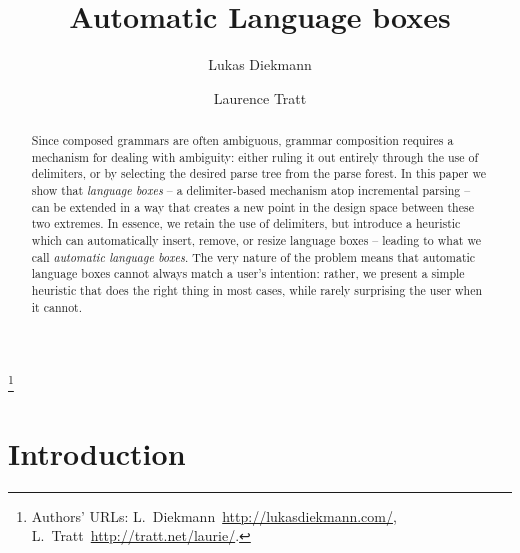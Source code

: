 \documentclass[sigplan,screen]{acmart}\settopmatter{printfolios=true,printccs=false,printacmref=false}
\begin{document}
\title{Automatic Language boxes}

\author{Lukas Diekmann}
\author{Laurence Tratt}
\thanks{Authors' URLs: %
    L.~Diekmann~\url{http://lukasdiekmann.com/},
    L.~Tratt~\url{http://tratt.net/laurie/}.
}


\begin{abstract}
Since composed grammars are often ambiguous, grammar composition requires a
mechanism for dealing with ambiguity: either ruling it out entirely through the use of
delimiters, or by selecting the desired parse tree from the parse forest.  In
this paper we show that \emph{language boxes} -- a delimiter-based
mechanism atop incremental parsing -- can be extended in a way that creates
a new point in the design space between these two extremes. In essence, we
retain the use of delimiters, but
introduce a heuristic which can automatically insert, remove, or resize
language boxes -- leading to what we call \emph{automatic language
boxes}. The very nature of the problem means that automatic language boxes
cannot always match a user's intention: rather, we present a simple
heuristic that does the right thing in most cases, while rarely surprising the
user when it cannot.
\end{abstract}


\maketitle

\section{Introduction}
\end{document}
